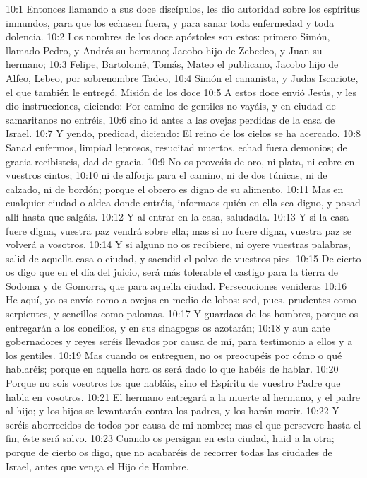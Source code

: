 10:1 Entonces llamando a sus doce discípulos, les dio autoridad sobre los espíritus inmundos, para que los echasen fuera, y para sanar toda enfermedad y toda dolencia. 
10:2 Los nombres de los doce apóstoles son estos: primero Simón, llamado Pedro, y Andrés su hermano; Jacobo hijo de Zebedeo, y Juan su hermano; 
10:3 Felipe, Bartolomé, Tomás, Mateo el publicano, Jacobo hijo de Alfeo, Lebeo, por sobrenombre Tadeo, 
10:4 Simón el cananista, y Judas Iscariote, el que también le entregó. 
Misión de los doce  
10:5 A estos doce envió Jesús, y les dio instrucciones, diciendo: Por camino de gentiles no vayáis, y en ciudad de samaritanos no entréis, 
10:6 sino id antes a las ovejas perdidas de la casa de Israel. 
10:7 Y yendo, predicad, diciendo: El reino de los cielos se ha acercado. 
10:8 Sanad enfermos, limpiad leprosos, resucitad muertos, echad fuera demonios; de gracia recibisteis, dad de gracia. 
10:9 No os proveáis de oro, ni plata, ni cobre en vuestros cintos; 
10:10 ni de alforja para el camino, ni de dos túnicas, ni de calzado, ni de bordón; porque el obrero es digno de su alimento. 
10:11 Mas en cualquier ciudad o aldea donde entréis, informaos quién en ella sea digno, y posad allí hasta que salgáis. 
10:12 Y al entrar en la casa, saludadla. 
10:13 Y si la casa fuere digna, vuestra paz vendrá sobre ella; mas si no fuere digna, vuestra paz se volverá a vosotros. 
10:14 Y si alguno no os recibiere, ni oyere vuestras palabras, salid de aquella casa o ciudad, y sacudid el polvo de vuestros pies. 
10:15 De cierto os digo que en el día del juicio, será más tolerable el castigo para la tierra de Sodoma y de Gomorra, que para aquella ciudad. 
Persecuciones venideras 
10:16 He aquí, yo os envío como a ovejas en medio de lobos; sed, pues, prudentes como serpientes, y sencillos como palomas. 
10:17 Y guardaos de los hombres, porque os entregarán a los concilios, y en sus sinagogas os azotarán; 
10:18 y aun ante gobernadores y reyes seréis llevados por causa de mí, para testimonio a ellos y a los gentiles. 
10:19 Mas cuando os entreguen, no os preocupéis por cómo o qué hablaréis; porque en aquella hora os será dado lo que habéis de hablar. 
10:20 Porque no sois vosotros los que habláis, sino el Espíritu de vuestro Padre que habla en vosotros. 
10:21 El hermano entregará a la muerte al hermano, y el padre al hijo; y los hijos se levantarán contra los padres, y los harán morir. 
10:22 Y seréis aborrecidos de todos por causa de mi nombre; mas el que persevere hasta el fin, éste será salvo. 
10:23 Cuando os persigan en esta ciudad, huid a la otra; porque de cierto os digo, que no acabaréis de recorrer todas las ciudades de Israel, antes que venga el Hijo de Hombre. 
